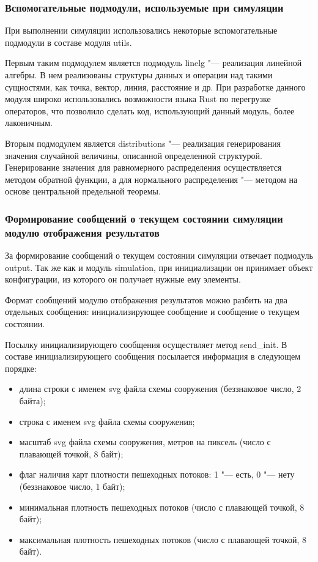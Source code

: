 \subsubsection{Вспомогательные подмодули, используемые при симуляции}
\label{sec:development:core:utils}

При выполнении симуляции использовались некоторые вспомогательные подмодули в составе модуля utils.

Первым таким подмодулем является подмодуль linelg "--- реализация линейной алгебры.
В нем реализованы структуры данных и операции над такими сущностями, как точка, вектор, линия, расстояние и др.
При разработке данного модуля широко использовались возможности языка Rust по перегрузке операторов,
что позволило сделать код, использующий данный модуль, более лаконичным.

Вторым подмодулем является distributions "--- реализация генерирования значения случайной величины, описанной определенной структурой.
Генерирование значения для равномерного распределения осуществляется методом обратной функции,
а для нормального распределения "--- методом на основе центральной предельной теоремы.

\subsubsection{Формирование сообщений о текущем состоянии симуляции модулю отображения результатов}
\label{sec:development:core:output}

За формирование сообщений о текущем состоянии симуляции отвечает подмодуль output.
Так же как и модуль simulation, при инициализации он принимает объект конфигурации, из которого он получает нужные ему элементы.

Формат сообщений модулю отображения результатов можно разбить на два отдельных сообщения: инициализирующее сообщение и сообщение о текущем состоянии.

Посылку инициализирующего сообщения осуществляет метод se\-nd\_in\-it.
В составе инициализирующего сообщения посылается информация в следующем порядке:
\begin{itemize}
  \item длина строки с именем svg файла схемы сооружения (беззнаковое число, 2 байта);
  \item строка с именем svg файла схемы сооружения;
  \item масштаб svg файла схемы сооружения, метров на пиксель (число с плавающей точкой, 8 байт);
  \item флаг наличия карт плотности пешеходных потоков: 1 "--- есть, 0 "--- нету (беззнаковое число, 1 байт);
  \item минимальная плотность пешеходных потоков (число с плавающей точкой, 8 байт);
  \item максимальная плотность пешеходных потоков (число с плавающей точкой, 8 байт).
\end{itemize}

